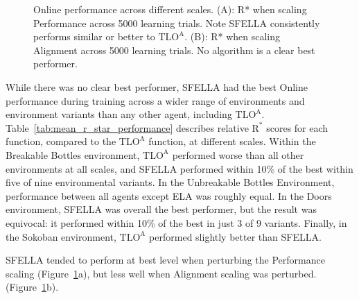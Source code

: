 \begin{figure}
  \caption{Online performance across different scales. (A): R* when scaling Performance across 5000 learning trials. Note SFELLA consistently performs similar or better to $\text{TLO}^\text{A}$. (B): R* when scaling Alignment across 5000 learning trials. No algorithm is a clear best performer.%
  }
   \label{fig:online_performance}
 \end{figure}

While there was no clear best performer, SFELLA had the best Online performance during training across a wider range of environments and environment variants than any other agent, including  $\text{TLO}^\text{A}$. Table~\ref{tab:mean_r_star_performance} describes relative $\text{R}^*$ scores for each function, compared to the $\text{TLO}^\text{A}$ function, at different scales.  Within the Breakable Bottles environment, $\text{TLO}^\text{A}$ performed worse than all other environments at all scales, and SFELLA performed within 10\% of the best within five of nine environmental variants. In the Unbreakable Bottles Environment, performance between all agents except ELA was roughly equal. In the Doors environment, SFELLA was overall the best performer, but the result was equivocal: it performed within 10\% of the best in just 3 of 9 variants. Finally, in the Sokoban environment, $\text{TLO}^\text{A}$ performed slightly better than SFELLA.

SFELLA tended to perform at best level when perturbing the Performance scaling (Figure~\ref{fig:online_performance}a), but less well when Alignment scaling was perturbed. (Figure~\ref{fig:online_performance}b).

